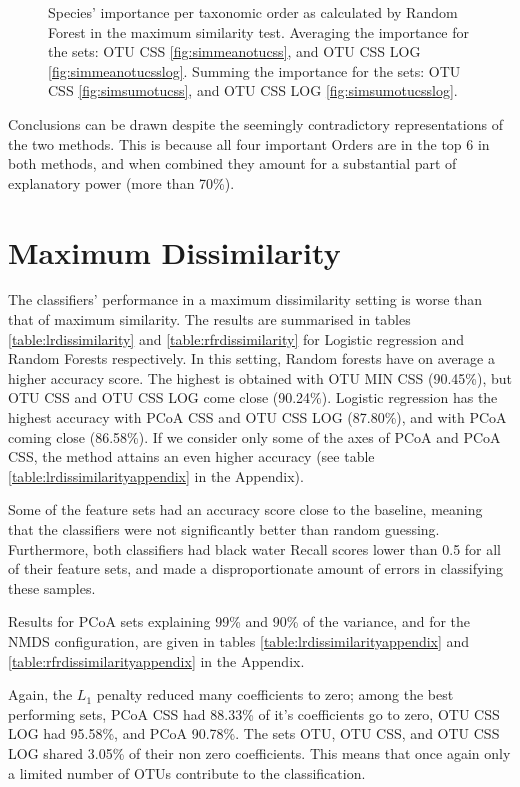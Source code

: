 \begin{figure}[h]
		\caption{Species' importance per taxonomic order as calculated by Random Forest in the maximum similarity test. Averaging the importance for the sets: OTU CSS \ref{fig:simmeanotucss}, and OTU CSS LOG \ref{fig:simmeanotucsslog}. Summing the importance for the sets: OTU CSS \ref{fig:simsumotucss}, and OTU CSS LOG \ref{fig:simsumotucsslog}. }
	\label{fig:simpie}
\end{figure}

Conclusions can be drawn despite the seemingly contradictory representations of the two methods. This is because all four important Orders are in the top 6 in both methods, and when combined they amount for a substantial part of explanatory power (more than 70\%).    


\section{Maximum Dissimilarity}

The classifiers' performance in a maximum dissimilarity setting is worse than that of maximum similarity. The results are summarised in tables \ref{table:lrdissimilarity} and \ref{table:rfrdissimilarity} for Logistic regression and Random Forests respectively. In this setting, Random forests have on average a higher accuracy score. The highest is obtained with OTU MIN CSS (90.45\%), but OTU CSS and OTU CSS LOG come close (90.24\%). Logistic regression has the highest accuracy with PCoA CSS and OTU CSS LOG (87.80\%), and with PCoA coming close (86.58\%). If we consider only some of the axes of PCoA and PCoA CSS, the method attains an even higher accuracy (see table \ref{table:lrdissimilarityappendix} in the Appendix).

Some of the feature sets had an accuracy score close to the baseline, meaning that the classifiers were not significantly better than random guessing. Furthermore, both classifiers had black water Recall scores lower than 0.5 for all of their feature sets, and made a disproportionate amount of errors in classifying these samples. 

Results for PCoA sets explaining 99\% and 90\% of the variance, and for the NMDS configuration, are given in tables \ref{table:lrdissimilarityappendix} and \ref{table:rfrdissimilarityappendix} in the Appendix.

Again, the $L_1$ penalty reduced many coefficients to zero; among the best performing sets,  PCoA CSS had 88.33\% of it's coefficients go to zero, OTU CSS LOG had 95.58\%, and PCoA 90.78\%. The sets OTU, OTU CSS, and OTU CSS LOG shared 3.05\% of their non zero coefficients. This means that once again only a limited number of OTUs contribute to the classification. 
 
